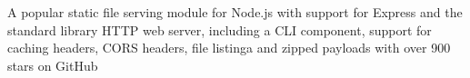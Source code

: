 \begin{project}

  \begin{projectdescription}
    A popular static file serving module for Node.js with support for Express
    and the standard library HTTP web server, including a CLI component, support
    for caching headers, CORS headers, file listinga and zipped payloads with
    over 900 stars on GitHub
  \end{projectdescription}
\end{project}
